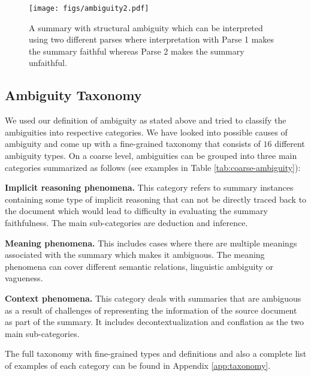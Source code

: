 \begin{figure}
    \centering
    \texttt{[image: figs/ambiguity2.pdf]}
    \vspace*{-0.7cm}
    \caption{A summary with structural ambiguity which can be interpreted using two different parses where interpretation with Parse 1 makes the summary faithful whereas Parse 2 makes the summary unfaithful.}
    \label{fig:ambiguity-motiv}
    \vspace*{-0.4cm}
\end{figure}
\subsection{Ambiguity Taxonomy}\label{sec:taxonomy}
We used our definition of ambiguity as stated above and tried to classify the ambiguities into respective categories. We have looked into possible causes of ambiguity and come up with a fine-grained taxonomy that consists of $16$ different ambiguity types. 
On a coarse level, ambiguities can be grouped into three main categories summarized as follows (see examples in Table \ref{tab:coarse-ambiguity}):

\noindent\textbf{Implicit reasoning phenomena.} This category refers to summary instances containing some type of implicit reasoning that can not be directly traced back to the document which would lead to difficulty in evaluating the summary faithfulness. The main sub-categories are deduction and inference.

\noindent\textbf{Meaning phenomena.}
This includes cases where there are multiple meanings associated with the summary which makes it ambiguous. The meaning phenomena can cover different semantic relations, linguistic ambiguity or vagueness. 

\noindent\textbf{Context phenomena.}
This category deals with summaries that are ambiguous as a result of challenges of representing the information of the source document as part of the summary. It includes decontextualization and conflation as the two main sub-categories.

The full taxonomy with fine-grained types and definitions and also a complete list of examples of each category can be found in Appendix \ref{app:taxonomy}.



